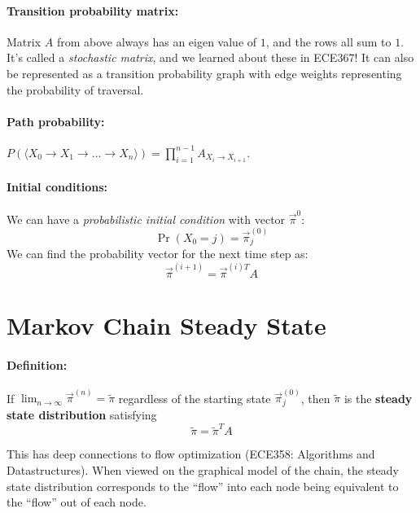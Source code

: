 \documentclass[a4paper,12pt]{report}
\begin{document}
\paragraph{Transition probability matrix: } Matrix $A$ from above always has an eigen value of $1$, and the rows all sum to $1$. It's called a \textit{stochastic matrix}, and we learned about these in ECE367! It can also be represented as a transition probability graph with edge weights representing the probability of traversal.

\paragraph{Path probability: } $P(\langle X_0 \to X_1 \to \dots \to X_n\rangle) = \prod_{i=1}^{n-1} A_{X_i \to X_{i+1}}$.

\paragraph{Initial conditions: } We can have a \textit{probabilistic initial condition} with vector $\vec \pi^0$:
\begin{equation}
\Pr(X_0 = j) = \vec \pi_j^{(0)}
\end{equation}
We can find the probability vector for the next time step as:
\begin{equation}
\vec \pi^{(i+1)} = \vec\pi^{(i)T}A
\end{equation}


\section{Markov Chain Steady State}

\paragraph{Definition: } If $\lim_{n\to \infty} \vec \pi^{(n)} = \tilde \pi$ regardless of the starting state $\vec \pi_j^{(0)}$, then $\tilde \pi$ is the \textbf{steady state distribution} satisfying
\begin{equation}
\tilde \pi = \tilde \pi^T A
\end{equation}

This has deep connections to flow optimization (ECE358: Algorithms and Datastructures). When viewed on the graphical model of the chain, the steady state distribution corresponds to the ``flow'' into each node being equivalent to the ``flow'' out of each node. 
\end{document}
